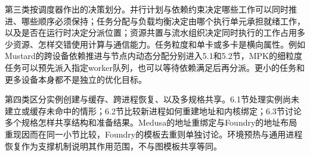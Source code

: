 \documentclass[UTF8,11pt,fontset=windows]{ctexart}
\begin{document}
第三类按调度器作出的决策划分。并行计划与依赖约束决定哪些工作可以同时推进、哪些顺序必须保持；任务分配与负载均衡决定由哪个执行单元承担就绪工作，以及是否在运行时决定分派位置；资源共置与流水组织决定同时执行的工作占用多少资源、怎样交错使用计算与通信能力。任务粒度和单卡或多卡是横向属性。例如Mustard的跨设备依赖推进与节点内动态分配分别进入5.1和5.2节，MPK的细粒度任务可以预先派入指定worker队列，也可以等待依赖满足后再分派。更小的任务和更多设备本身都不是独立的优化目标。

第四类区分实例创建与缓存、跨进程恢复、以及多规格共享。6.1节处理实例尚未建立或缓存未命中的情形；6.2节比较新进程如何重建地址和内核绑定；6.3节讨论多个规格怎样共享结构和准备结果。Medusa的地址重绑定与Foundry的地址布局重现因而在同一小节比较，Foundry的模板去重则单独讨论。环境预热与通用进程恢复作为支撑机制说明其作用范围，不与图模板共享等同。
\end{document}
